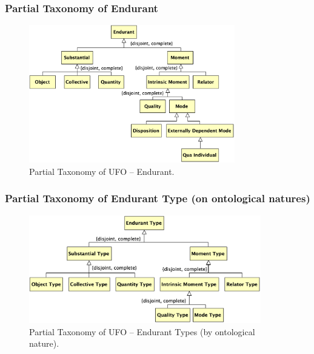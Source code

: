 \documentclass{article}
\newcommand{\BeginEndurantTaxonomy}{88}
\newcommand{\EndEndurantTaxonomy}{145}
\begin{document}
\subsubsection{Partial Taxonomy of Endurant}

\begin{figure}[ht]
    \centering
    \includegraphics[width=0.8\textwidth]{diagrams/Endurant_Diagram.png}
    \caption{Partial Taxonomy of UFO -- Endurant.}
    \label{fig:ufo_taxonomy_endurant}
\end{figure}



\subsubsection{Partial Taxonomy of Endurant Type (on ontological natures)}

\begin{figure}[ht]
    \centering
    \includegraphics[width=0.9\textwidth]{diagrams/Endurant_Type_Natures_Diagram.png}
    \caption{Partial Taxonomy of UFO -- Endurant Types (by ontological nature).}
    \label{fig:ufo_taxonomy_endurant_types_natures}
\end{figure}
\end{document}
